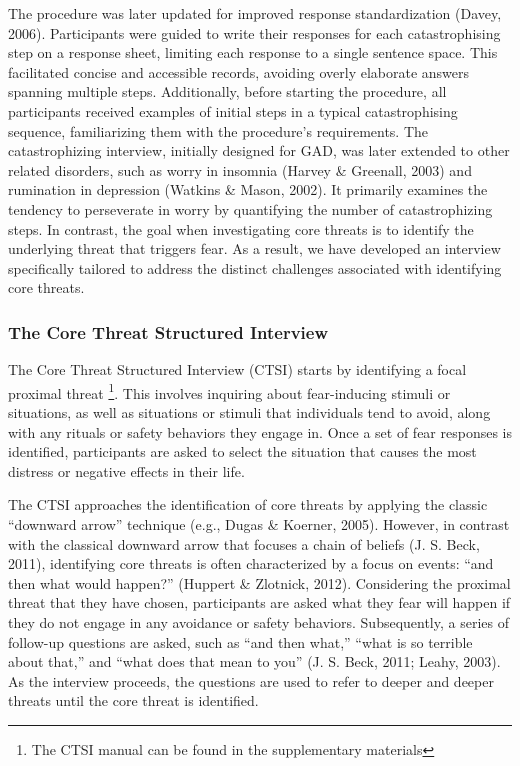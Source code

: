 \documentclass[
  man,floatsintext]{apa7}
\begin{document}
The procedure was later updated for improved response standardization (Davey, 2006).
Participants were guided to write their responses for each catastrophising step on a response sheet, limiting each response to a single sentence space.
This facilitated concise and accessible records, avoiding overly elaborate answers spanning multiple steps.
Additionally, before starting the procedure, all participants received examples of initial steps in a typical catastrophising sequence, familiarizing them with the procedure's requirements.
The catastrophizing interview, initially designed for GAD, was later extended to other related disorders, such as worry in insomnia (Harvey \& Greenall, 2003) and rumination in depression (Watkins \& Mason, 2002).
It primarily examines the tendency to perseverate in worry by quantifying the number of catastrophizing steps.
In contrast, the goal when investigating core threats is to identify the underlying threat that triggers fear.
As a result, we have developed an interview specifically tailored to address the distinct challenges associated with identifying core threats.

\subsubsection{The Core Threat Structured Interview}\label{the-core-threat-structured-interview}

The Core Threat Structured Interview (CTSI) starts by identifying a focal proximal threat
\footnote{The CTSI manual can be found in the supplementary materials}.
This involves inquiring about fear-inducing stimuli or situations, as well as situations or stimuli that individuals tend to avoid, along with any rituals or safety behaviors they engage in.
Once a set of fear responses is identified, participants are asked to select the situation that causes the most distress or negative effects in their life.

The CTSI approaches the identification of core threats by applying the classic ``downward arrow'' technique (e.g., Dugas \& Koerner, 2005).
However, in contrast with the classical downward arrow that focuses a chain of beliefs (J. S. Beck, 2011),
identifying core threats is often characterized by a focus on events: ``and then what would happen?'' (Huppert \& Zlotnick, 2012).
Considering the proximal threat that they have chosen, participants are asked what they fear will happen if they do not engage in any avoidance or safety behaviors.
Subsequently, a series of follow-up questions are asked, such as ``and then what,'' ``what is so terrible about that,'' and ``what does that mean to you'' (J. S. Beck, 2011; Leahy, 2003).
As the interview proceeds, the questions are used to refer to deeper and deeper threats until the core threat is identified.
\end{document}
